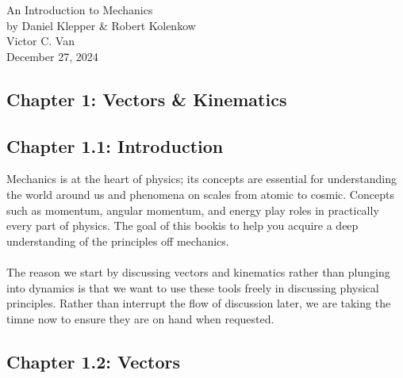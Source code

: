 \documentclass[11pt]{article}
\begin{document}
\begin{titlepage}
    \centering
    \vspace*{\fill} %
    {\Large An Introduction to Mechanics} \\[0.5cm]
    {\Large by Daniel Klepper \& Robert Kolenkow} \\[0.5cm]
    {\large Victor C. Van} \\[1cm]
    {\large December 27, 2024}
    \vspace*{\fill} %
\end{titlepage}

\newpage

\begin{center}
    \item \section*{Chapter 1: Vectors \& Kinematics}
\end{center}

\begin{center}
    \item \subsection*{Chapter 1.1: Introduction}
\end{center}

Mechanics is at the heart of physics; its concepts are essential for understanding the world around us and phenomena on scales from atomic to cosmic.
Concepts such as momentum, angular momentum, and energy  play roles in practically every part of physics.
The goal of this bookis to help you acquire a deep understanding of the principles off mechanics.\\\\

The reason we start by discussing vectors and kinematics rather than plunging into dynamics is that we want to use
these tools freely in discussing physical principles. Rather than interrupt the flow of discussion later,
we are taking the timne now to ensure they are on hand when requested.

\begin{center}
    \item \subsection*{Chapter 1.2: Vectors}
\end{center}
\end{document}
